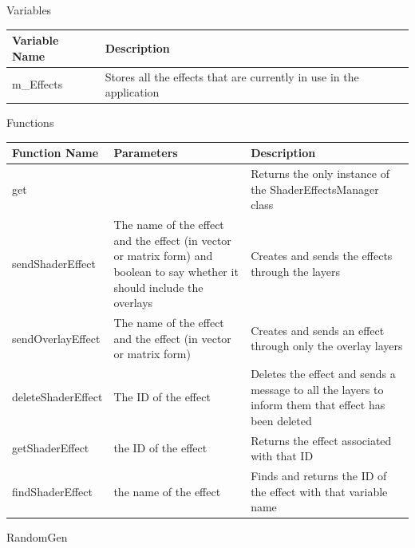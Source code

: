 \documentclass[../../Main.tex]{subfiles}
\begin{document}
    \begin{center}
        Variables
        \begin{tabular}{ | m{} | m{} | }
            \hline
            \textbf{Variable Name} & \textbf{Description} \\
            \hline
            m\_Effects & Stores all the effects that are currently in use in the application \\
            \hline
        \end{tabular}
        Functions
        \begin{tabular}{ | m{} | m{}| m{} | }
            \hline
            \textbf{Function Name} & \textbf{Parameters} & \textbf{Description} \\
            \hline
            get & & Returns the only instance of the ShaderEffectsManager class \\
            \hline
            sendShaderEffect & The name of the effect and the effect (in vector or matrix form) and boolean to say whether it should include the overlays & Creates and sends the effects through the layers \\
            \hline
            sendOverlayEffect & The name of the effect and the effect (in vector or matrix form) & Creates and sends an effect through only the overlay layers \\
            \hline
            deleteShaderEffect & The ID of the effect & Deletes the effect and sends a message to all the layers to inform them that effect has been deleted \\
            \hline
            getShaderEffect & the ID of the effect & Returns the effect associated with that ID \\
            \hline
            findShaderEffect & the name of the effect & Finds and returns the ID of the effect with that variable name \\
            \hline
        \end{tabular}
    \end{center}
    RandomGen
\end{document}
